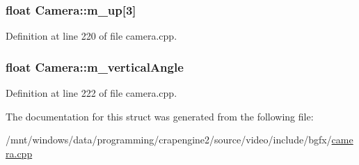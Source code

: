 \hypertarget{struct_camera_ac2875af5cfbc44c0e307d640c1a5c151}{
\subsubsection[{m\+\_\+up}]{\setlength{\rightskip}{0pt plus 5cm}float Camera\+::m\+\_\+up\mbox{[}3\mbox{]}}}\label{struct_camera_ac2875af5cfbc44c0e307d640c1a5c151}


Definition at line 220 of file camera.\+cpp.

\hypertarget{struct_camera_a416376dc2c43f46061c2c7de7cbedfae}{
\subsubsection[{m\+\_\+vertical\+Angle}]{\setlength{\rightskip}{0pt plus 5cm}float Camera\+::m\+\_\+vertical\+Angle}}\label{struct_camera_a416376dc2c43f46061c2c7de7cbedfae}


Definition at line 222 of file camera.\+cpp.



The documentation for this struct was generated from the following file\+:\begin{DoxyCompactItemize}
\item 
/mnt/windows/data/programming/crapengine2/source/video/include/bgfx/\hyperlink{camera_8cpp}{camera.\+cpp}\end{DoxyCompactItemize}
